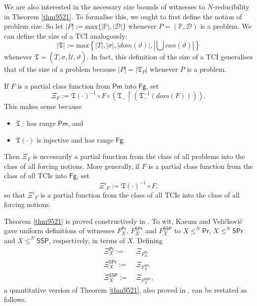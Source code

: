 \documentclass[12pt, twoside]{memoir}
\numberwithin{equation}{section}
\theoremstyle{definition}
\theoremstyle{remark}
\theoremstyle{definition}
\theoremstyle{definition}
\theoremstyle{definition}
\theoremstyle{remark}
\begin{document}
We are also interested in the necessary size bounds of witnesses to $N$-reducibility in Theorem \ref{thm9521}. To formalise this, we ought to first define the notion of problem size. So let $|P| := \mathrm{max}\{|\mathbb{P}|, |\mathcal{D}|\}$ whenever $P = (\mathbb{P}, \mathcal{D})$ is a problem. We can define the size of a TCI analogously: 
\begin{equation*}
    |\mathfrak{T}| := \mathrm{max} \left\{ |T|, |\sigma|, |dom(\vartheta)|, \left| \bigcup ran(\vartheta) \right| \right\}
\end{equation*}
whenever $\mathfrak{T} = (T, \sigma, \dot{\mathcal{U}}, \vartheta)$. In fact, this definition of the size of a TCI generalises that of the size of a problem because $|P| = |\mathfrak{T}_P|$ whenever $P$ is a problem.

If $F$ is a partial class function from $\mathsf{Pm}$ into $\mathsf{Fg}$, set 
\begin{equation*}
    \Xi_F := \mathfrak{T}(\cdot)^{-1} \circ F \circ (\mathfrak{T}_{-} \restriction (\mathfrak{T}_{-}^{-1}(dom(F)))) \text{.}
\end{equation*}
This makes sense because 
\begin{itemize}
    \item $\mathfrak{T}_{-}$ has range $\mathsf{Pm}$, and
    \item $\mathfrak{T}(\cdot)$ is injective and has range $\mathsf{Fg}$.
\end{itemize}
Then $\Xi_F$ is necessarily a partial function from the class of all problems into the class of all forcing notions. More generally, if $F$ is a partial class function from the class of all TCIs into $\mathsf{Fg}$, set 
\begin{equation*}
    \Xi'_F := \mathfrak{T}(\cdot)^{-1} \circ F \text{,}
\end{equation*}
so that $\Xi'_F$ is a partial function from the class of all TCIs into the class of all forcing notions.

Theorem \ref{thm9521} is proved constructively in \cite{kasum}. To wit, Kasum and Veli\v{c}kovi\'{c} gave uniform definitions of witnesses $F^{\mathsf{Pr}}_X$, $F^{\mathsf{SPr}}_X$ and $F^{\mathsf{SSP}}_X$ to $X \leq^N \mathsf{Pr}$, $X \leq^N \mathsf{SPr}$ and $X \leq^N \mathsf{SSP}$, respectively, in terms of $X$. Defining 
\begin{align*}
    \Xi^{\mathsf{Pr}}_{X} := \ & \Xi_{F^{\mathsf{Pr}}_X} \\
    \Xi^{\mathsf{SPr}}_{X} := \ & \Xi_{F^{\mathsf{SPr}}_X} \\
    \Xi^{\mathsf{SSP}}_{X} := \ & \Xi_{F^{\mathsf{SSP}}_X} \text{,}
\end{align*}
a quantitative version of Theorem \ref{thm9521}, also proved in \cite{kasum}, can be restated as follows.
\end{document}
